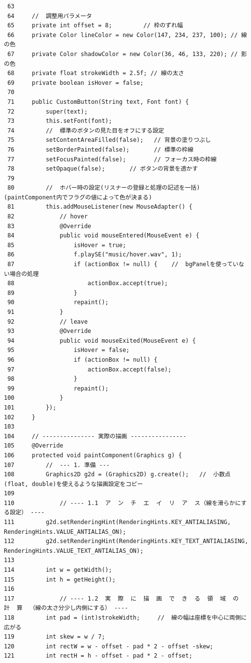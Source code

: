 \documentclass[11pt,a4j]{jarticle}
\begin{document}
\begin{small}
\begin{verbatim}
 63 
 64     //  調整用パラメータ
 65     private int offset = 8;         // 枠のずれ幅
 66     private Color lineColor = new Color(147, 234, 237, 100); // 線の色
 67     private Color shadowColor = new Color(36, 46, 133, 220); // 影の色
 68     private float strokeWidth = 2.5f; // 線の太さ
 69     private boolean isHover = false; 
 70 
 71     public CustomButton(String text, Font font) {
 72         super(text);
 73         this.setFont(font);
 74         //  標準のボタンの見た目をオフにする設定
 75         setContentAreaFilled(false);   // 背景の塗りつぶし
 76         setBorderPainted(false);       // 標準の枠線
 77         setFocusPainted(false);        // フォーカス時の枠線
 78         setOpaque(false);       // ボタンの背景を透かす
 79 
 80         //  ホバー時の設定(リスナーの登録と処理の記述を一括)(paintComponent内でフラグの値によって色が決まる)
 81         this.addMouseListener(new MouseAdapter() {
 82             // hover
 83             @Override
 84             public void mouseEntered(MouseEvent e) {
 85                 isHover = true;
 86                 f.playSE("music/hover.wav", 1);
 87                 if (actionBox != null) {    //  bgPanelを使っていない場合の処理
 88                     actionBox.accept(true);
 89                 }
 90                 repaint();
 91             }
 92             // leave
 93             @Override
 94             public void mouseExited(MouseEvent e) {
 95                 isHover = false;
 96                 if (actionBox != null) {
 97                     actionBox.accept(false);
 98                 }
 99                 repaint();
100             }
101         });
102     }
103 
104     // --------------- 実際の描画 ----------------
105     @Override
106     protected void paintComponent(Graphics g) {
107         //  --- 1. 準備 ---
108         Graphics2D g2d = (Graphics2D) g.create();   //  小数点(float, double)を使えるような描画設定をコピー
109 
110             // ---- 1.1  ア  ン  チ  エ  イ  リ  ア  ス（線を滑らかにする設定） ----
111         g2d.setRenderingHint(RenderingHints.KEY_ANTIALIASING, RenderingHints.VALUE_ANTIALIAS_ON);
112         g2d.setRenderingHint(RenderingHints.KEY_TEXT_ANTIALIASING, RenderingHints.VALUE_TEXT_ANTIALIAS_ON);
113 
114         int w = getWidth();
115         int h = getHeight();
116 
117             // ---- 1.2  実  際  に  描  画  で  き  る  領  域  の  計  算  （線の太さ分少し内側にする） ----
118         int pad = (int)strokeWidth;     //  線の幅は座標を中心に両側に広がる
119         int skew = w / 7;
120         int rectW = w - offset - pad * 2 - offset -skew;
121         int rectH = h - offset - pad * 2 - offset;

\end{verbatim}
\end{small}
\end{document}
